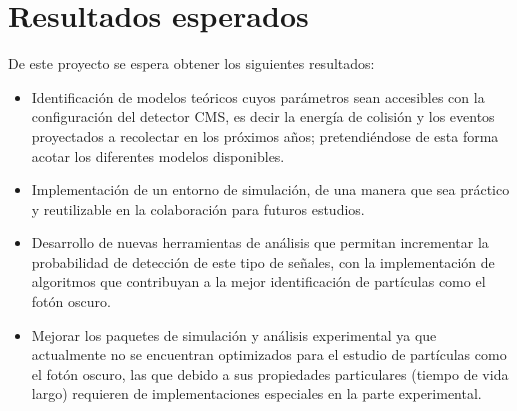\chapter{Resultados esperados}

De este proyecto se espera obtener los siguientes resultados:
\begin{itemize}
    \item Identificación de modelos teóricos cuyos parámetros sean accesibles con la configuración del detector CMS, es decir la energía de colisión y los eventos proyectados a recolectar en los próximos años; pretendiéndose de esta forma acotar los diferentes modelos disponibles.
    \item Implementación de un entorno de simulación, de una manera que sea práctico y reutilizable en la colaboración para futuros estudios.
    \item Desarrollo de nuevas herramientas de análisis que permitan incrementar la probabilidad de detección de este tipo de señales, con la implementación de algoritmos que contribuyan a la mejor identificación de partículas como el fotón oscuro.
    \item Mejorar los paquetes de simulación y análisis experimental ya que actualmente no se encuentran optimizados para el estudio de partículas como el fotón oscuro, las que debido a sus propiedades particulares (tiempo de vida largo) requieren de implementaciones especiales en la parte experimental.
\end{itemize}
